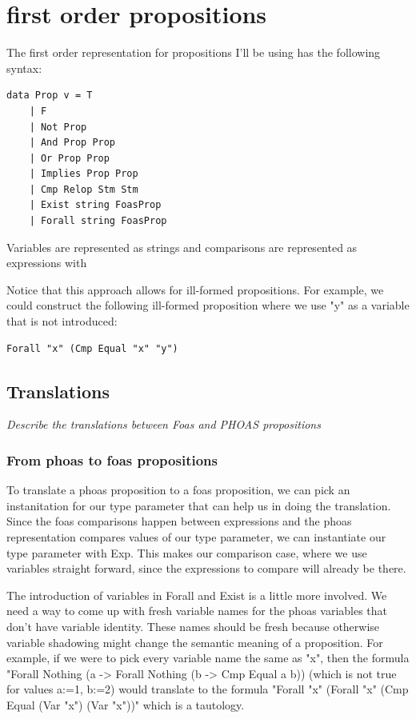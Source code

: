 \section{first order propositions}
The first order representation for propositions I'll be using has the following syntax:

\begin{verbatim}
data Prop v = T 
    | F 
    | Not Prop
    | And Prop Prop 
    | Or Prop Prop 
    | Implies Prop Prop
    | Cmp Relop Stm Stm 
    | Exist string FoasProp 
    | Forall string FoasProp
\end{verbatim}

Variables are represented as strings and comparisons are represented as expressions with 

Notice that this approach allows for ill-formed propositions. For example, we could construct the following ill-formed proposition where we use "y" as a variable that is not introduced:
\begin{verbatim}
Forall "x" (Cmp Equal "x" "y")
\end{verbatim}




\subsection{Translations \label{translation}}
\textit{Describe the translations between Foas and PHOAS propositions}
\subsubsection{From phoas to foas propositions}

To translate a phoas proposition to a foas proposition, we can pick an instanitation for our type parameter that can help us in doing the translation. Since the foas comparisons happen between expressions and the phoas representation compares values of our type parameter, we can instantiate our type parameter with Exp. This makes our comparison case, where we use variables straight forward, since the expressions to compare will already be there.

The introduction of variables in Forall and Exist is a little more involved. We need a way to come up with fresh variable names for the phoas variables that don't have  variable identity. These names should be fresh because otherwise variable shadowing might change the semantic meaning of a proposition. For example, if we were to pick every variable name the same as "x", then the formula "Forall Nothing (a -> Forall Nothing (b -> Cmp Equal a b)) (which is not true for values a:=1, b:=2) would translate to the formula "Forall "x" (Forall "x" (Cmp Equal (Var "x") (Var "x"))" which is a tautology. 

